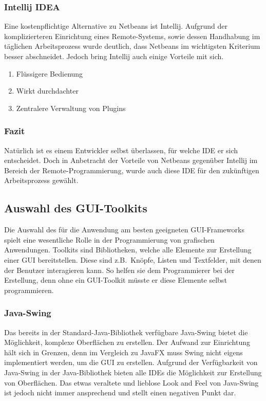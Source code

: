 \subsubsection{Intellij IDEA}
Eine kostenpflichtige Alternative zu Netbeans ist Intellij.
Aufgrund der komplizierteren Einrichtung eines Remote-Systems, sowie dessen Handhabung im täglichen Arbeitsprozess wurde deutlich, dass Netbeans im wichtigsten Kriterium besser abschneidet.
Jedoch bring Intellij auch einige Vorteile mit sich.
\newpage
\begin{enumerate}
    \item Flüssigere Bedienung
    \item Wirkt durchdachter
    \item Zentralere Verwaltung von Plugins
\end{enumerate}
\subsubsection{Fazit}
Natürlich ist es einem Entwickler selbst überlassen, für welche IDE er sich entscheidet.
Doch in Anbetracht der Vorteile von Netbeans gegenüber Intellij im Bereich der Remote-Programmierung, wurde auch diese IDE für den zukünftigen Arbeitsprozess gewählt.
\subsection{Auswahl des \acs{GUI}-Toolkits}\label{subsec:auswahl-des-gui-frameworks}
Die Auswahl des für die Anwendung am besten geeigneten GUI-Frameworks spielt eine wesentliche Rolle in der Programmierung von grafischen Anwendungen.
Toolkits sind Bibliotheken, welche alle Elemente zur Erstellung einer GUI bereitstellen.
Diese sind z.B.\ Knöpfe, Listen und Textfelder, mit denen der Benutzer interagieren kann.
So helfen sie dem Programmierer bei der Erstellung, denn ohne ein GUI-Toolkit müsste er diese Elemente selbst programmieren.
\subsubsection{Java-Swing}
Das bereits in der Standard-Java-Bibliothek verfügbare Java-Swing bietet die Möglichkeit, komplexe Oberflächen zu erstellen.
Der Aufwand zur Einrichtung hält sich in Grenzen, denn im Vergleich zu JavaFX muss Swing nicht eigens implementiert werden, um die GUI zu erstellen.
Aufgrund der Verfügbarkeit von Java-Swing in der Java-Bibliothek bieten alle IDEs die Möglichkeit zur Erstellung von Oberflächen.
Das etwas veraltete und lieblose Look and Feel von Java-Swing ist jedoch nicht immer ansprechend und stellt einen negativen Punkt dar.
